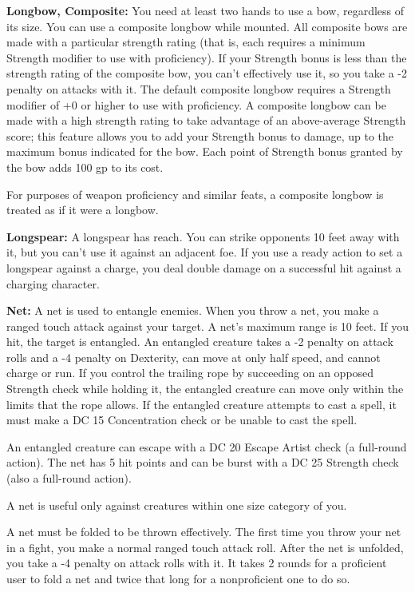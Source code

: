 \documentclass{article}
\begin{document}
\textbf{Longbow, Composite:} You need at least two hands to use a bow, regardless 
of its size. You can use a composite longbow while mounted. All composite bows 
are made with a particular strength rating (that is, each requires a minimum Strength 
modifier to use with proficiency). If your Strength bonus is less than the strength 
rating of the composite bow, you can't effectively use it, so you take a -2 penalty 
on attacks with it. The default composite longbow requires a Strength modifier 
of +0 or higher to use with proficiency. A composite longbow can be made with a 
high strength rating to take advantage of an above-average Strength score; this 
feature allows you to add your Strength bonus to damage, up to the maximum bonus 
indicated for the bow. Each point of Strength bonus granted by the bow adds 100 
gp to its cost.

For purposes of weapon proficiency and similar feats, a composite longbow is treated 
as if it were a longbow.

\textbf{Longspear: }A longspear has reach. You can strike opponents 10 feet away 
with it, but you can't use it against an adjacent foe. If you use a ready action 
to set a longspear against a charge, you deal double damage on a successful hit 
against a charging character.

\textbf{Net:} A net is used to entangle enemies. When you throw a net, you make 
a ranged touch attack against your target. A net's maximum range is 10 feet. If 
you hit, the target is entangled. An entangled creature takes a -2 penalty on attack 
rolls and a -4 penalty on Dexterity, can move at only half speed, and cannot charge 
or run. If you control the trailing rope by succeeding on an opposed Strength check 
while holding it, the entangled creature can move only within the limits that the 
rope allows. If the entangled creature attempts to cast a spell, it must make a 
DC 15 Concentration check or be unable to cast the spell.

An entangled creature can escape with a DC 20 Escape Artist check (a full-round 
action). The net has 5 hit points and can be burst with a DC 25 Strength check 
(also a full-round action).

A net is useful only against creatures within one size category of you.

A net must be folded to be thrown effectively. The first time you throw your net 
in a fight, you make a normal ranged touch attack roll. After the net is unfolded, 
you take a -4 penalty on attack rolls with it. It takes 2 rounds for a proficient 
user to fold a net and twice that long for a nonproficient one to do so.
\end{document}
